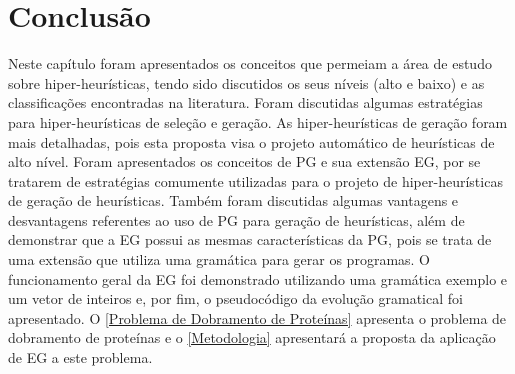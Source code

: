 \section{Conclusão}
\label{ReferencialTeorico:Conclusão}

Neste capítulo foram apresentados os conceitos que permeiam a área de estudo sobre hiper-heurísticas, tendo sido discutidos os seus níveis (alto e baixo) e as classificações encontradas na literatura.  Foram discutidas algumas estratégias para hiper-heurísticas de seleção e geração. As hiper-heurísticas de geração foram mais detalhadas, pois esta proposta visa o projeto  automático de heurísticas de alto nível. Foram apresentados os conceitos de PG e sua extensão EG, por se tratarem de estratégias comumente utilizadas para o projeto de hiper-heurísticas de geração de heurísticas. Também foram discutidas algumas vantagens e desvantagens referentes ao uso de PG para geração de heurísticas, além de demonstrar que a EG possui as mesmas características da PG, pois se trata de uma extensão que utiliza uma gramática para gerar os programas. O funcionamento geral da EG foi demonstrado utilizando uma gramática exemplo e um vetor de inteiros e, por fim, o pseudocódigo da evolução gramatical foi apresentado. O  \autoref{Problema de Dobramento de Proteínas} apresenta o problema de dobramento de proteínas e o \autoref{Metodologia} apresentará a proposta da aplicação de EG a este problema.





